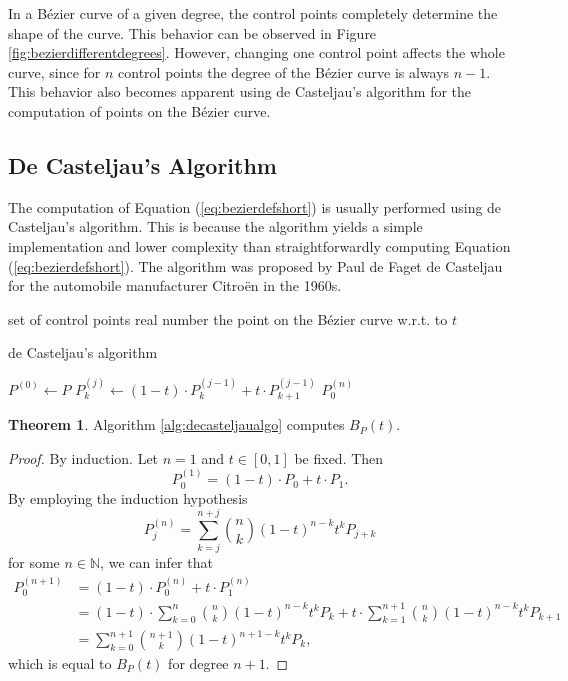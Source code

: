 \documentclass[a4paper, 11pt]{report}
\theoremstyle{definition}
\newtheorem{theorem}[definition]{Theorem}
\newcommand{\Desc}[2]{\State \makebox[12em][l]{#1}#2}
\begin{document}
	In a Bézier curve of a given degree, the control points completely determine the shape of the curve. This behavior can be observed in Figure \ref{fig:bezierdifferentdegrees}. However, changing one control point affects the whole curve, since for $n$ control points the degree of the Bézier curve is always $n-1$. This behavior also becomes apparent using de Casteljau's algorithm for the computation of points on the Bézier curve.

\subsection{De Casteljau's Algorithm}
	The computation of Equation (\ref{eq:bezierdefshort}) is usually performed using de Casteljau's algorithm. This is because the algorithm yields a simple implementation and lower complexity than straightforwardly computing Equation (\ref{eq:bezierdefshort}). The algorithm was proposed by Paul de Faget de Casteljau for the automobile manufacturer Citroën in the 1960s.

	\begin{algorithm}[H]
		\begin{algorithmic}[1]
			\Input
				\Desc{$P = \{P_0, P_1, ..., P_n\}$}{set of control points}
				\Desc{$t$}{real number}
			\EndInput
			\Output
				\Desc{$P^{(n)}_0 = B_P(t)$}{the point on the Bézier curve w.r.t. to $t$}
			\EndOutput

			\caption{de Casteljau's algorithm}\label{alg:decasteljaualgo}
				\State $P^{(0)} \gets P$
						\State $P^{(j)}_k \gets (1-t) \cdot P^{(j-1)}_k + t \cdot P^{(j-1)}_{k+1}$
					\EndFor
				\EndFor
				\State \Return $P^{(n)}_0$
			\EndProcedure
		\end{algorithmic}
	\end{algorithm}

	\begin{theorem}
		Algorithm \ref{alg:decasteljaualgo} computes $B_P(t)$.
	\end{theorem}
	\begin{proof}
		By induction. Let $n = 1$ and $t \in [0,1]$ be fixed. Then
			$$ P_0^{(1)} = (1-t) \cdot P_0 + t \cdot P_1.$$
		By employing the induction hypothesis
			$$ P_j^{(n)} = \sum_{k=j}^{n+j} \binom{n}{k} (1-t)^{n-k}t^k P_{j+k}$$
		for some $n \in \mathbb{N}$, we can infer that
		\begin{align*}
			P_0^{(n+1)}	&= (1-t) \cdot P_0^{(n)} + t \cdot P_1^{(n)} \\
						&= (1-t) \cdot \sum_{k=0}^{n} \binom{n}{k} (1-t)^{n-k}t^k P_{k} + t \cdot \sum_{k=1}^{n+1} \binom{n}{k} (1-t)^{n-k}t^k P_{k+1} \\
						&= \sum_{k=0}^{n+1} \binom{n+1}{k} (1-t)^{n+1-k}t^k P_{k},
		\end{align*}
		which is equal to $B_P(t)$ for degree $n+1$.
	\end{proof}
\end{document}
